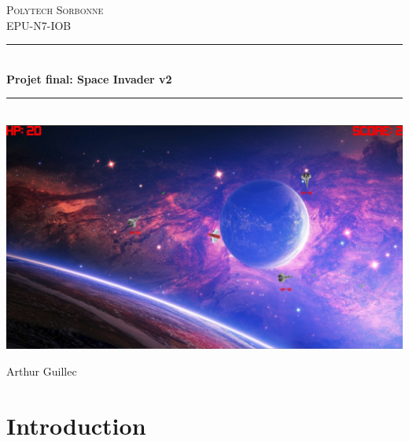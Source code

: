 \documentclass{article}
\title{}
\author{}
\date{}
\title{}
\author{}
\date{}
\newcommand{\HRule}{\rule{\linewidth}{0.5mm}}
\begin{document}
\begin{titlepage}
  \begin{sffamily}
  \begin{center}


    \textsc{\LARGE Polytech Sorbonne}\\[2cm]

    \textsc{\Large EPU-N7-IOB}\\[1.5cm]

    \HRule \\[0.4cm]
    { \huge \bfseries Projet final: Space Invader v2\\[0.4cm] }

    \HRule \\[2cm]
    \includegraphics[width=1\textwidth]{assets/img/illustration.png}
    \\[2cm]

    \vfill
    \begin{minipage}{0.4\textwidth}
      \begin{center} \large
        Arthur Guillec\\
      \end{center}
    \end{minipage}
    \vfill

  \end{center}
  \end{sffamily}
\end{titlepage}


\section{Introduction}
\end{document}
